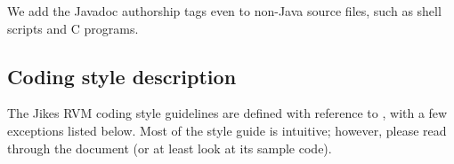 We add the Javadoc authorship tags even to non-Java\TMweb{} source
files, such as shell scripts and C programs.

%
%
\subsection{Coding style description}

The Jikes\TMweb{} RVM coding style guidelines are defined with
reference to ,
with a few exceptions listed below.  Most of the style guide is intuitive; 
however, please read through the document (or at least look at its sample code).

